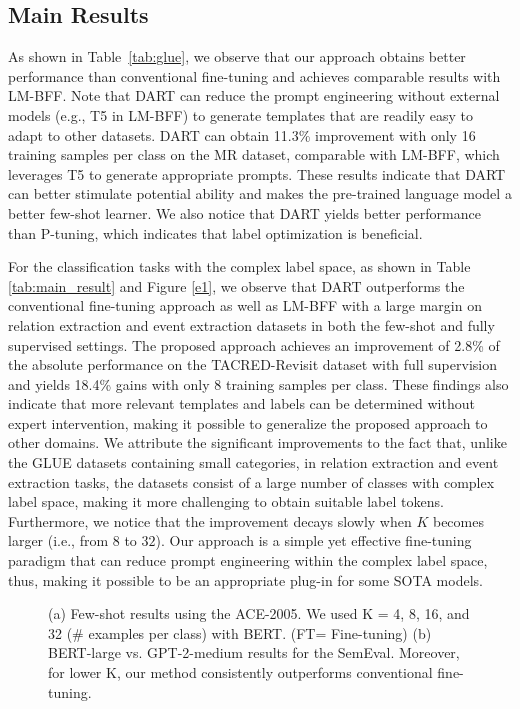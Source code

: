 \documentclass{article} \usepackage{iclr2022_conference,times}
\begin{document}
\subsection{Main Results}

As shown in Table~\ref{tab:glue}, we observe that our approach obtains better performance than conventional fine-tuning and achieves comparable results with LM-BFF. 
Note that DART can reduce the prompt engineering without external models (e.g., T5 in LM-BFF) to generate templates that are readily easy to adapt to other datasets. 
DART can obtain 11.3\% improvement with only 16 training samples per class on the MR dataset, comparable with LM-BFF, which leverages T5 to generate appropriate prompts.
These results indicate that DART can better stimulate potential ability and makes the pre-trained language model a better few-shot learner. 
We also notice that DART yields better performance than P-tuning, which indicates that label optimization is beneficial. 



For the classification tasks with the complex label space, as shown in Table \ref{tab:main_result} and Figure \ref{e1}, we observe that DART outperforms the conventional fine-tuning approach as well as LM-BFF with a large margin on relation extraction and event extraction datasets in both the few-shot and fully supervised settings.
The proposed approach achieves an improvement of 2.8\% of the absolute performance on the TACRED-Revisit dataset with full supervision and yields 18.4\% gains with only 8 training samples per class. 
These findings also indicate that more relevant templates and labels can be determined without expert intervention, making it possible to generalize the proposed approach to other domains.
{\color{highlight}
We attribute the significant improvements to the fact that, unlike the GLUE datasets containing small categories, in relation extraction and event extraction tasks, the datasets consist of a large number of classes with complex label space, making it more challenging to obtain suitable label tokens.
}
Furthermore, we notice that the improvement decays slowly when $K$ becomes larger (i.e., from $8$ to $32$).
Our approach is a simple yet effective fine-tuning paradigm that can reduce prompt engineering within the complex label space, thus, making it possible to be an appropriate plug-in for some SOTA models.

\begin{figure*}[!htbp]
\centering
{}

\caption{
(a) Few-shot results using the ACE-2005.
We used K = 4, 8, 16, and 32 (\# examples per class) with BERT. (FT= Fine-tuning)
(b) BERT-large vs. GPT-2-medium results for the SemEval. 
Moreover, for lower K, our method consistently outperforms conventional fine-tuning.
}
\label{exp2}
\end{figure*}
\end{document}
